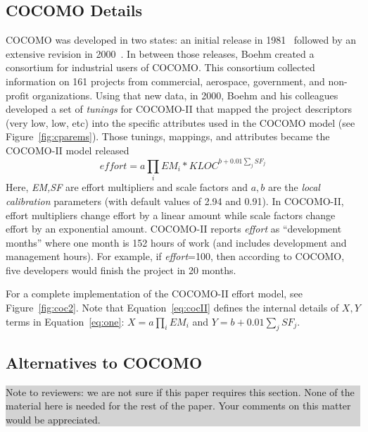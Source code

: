 \documentclass[final,twocolumn]{elsarticle}
\newcommand{\fig}[1]{Figure~\ref{fig:#1}}
\newcommand{\eq}[1]{Equation~\ref{eq:#1}}
\theoremstyle{break}
\begin{document}
 

  \subsection{COCOMO Details}

  COCOMO was developed in two states: an initial release in 1981~\cite{boehm81}
  followed by an extensive revision in  2000~\cite{boehm00b}.
  In between those releases,
  Boehm created a consortium for
industrial users of COCOMO.
This consortium
collected information on 161 projects from commercial,
aerospace, government, and non-profit organizations.
Using that new data, in 2000, Boehm and his colleagues developed
a set of   {\em tunings} for COCOMO-II that
mapped the project descriptors (very low, low, etc)
into the specific attributes used in the COCOMO model (see \fig{cparems}).
Those tunings, mappings, and attributes became the COCOMO-II model
released 
\begin{equation}\label{eq:cocII}
\mathit{effort}=a\prod_i EM_i *\mathit{KLOC}^{b+0.01\sum_j SF_j}
\end{equation}
Here, {\em EM,SF} are effort multipliers and scale factors and $a,b$ are the
{\em local calibration} parameters (with default values of 2.94 and 0.91).  In
COCOMO-II, effort multipliers change effort by a linear amount while scale
factors change effort by an exponential amount.  COCOMO-II reports {\em effort}
as ``development months'' where one month is 152 hours of work (and includes
development and management hours).  For example, if {\em effort}=100, then
according to COCOMO, five developers would finish the project in 20 months.

For a complete implementation of the COCOMO-II effort model, see \fig{coc2}.
Note that \eq{cocII} defines the internal details of $X,Y$ terms in \eq{one}:
\mbox{$X=a\prod_i EM_i$} and \mbox{$Y=b+0.01\sum_j SF_j$}.




\subsection{Alternatives to COCOMO} \label{sect:altCoc}

\noindent\colorbox{lightgray}{%
    \parbox{\dimexpr\linewidth-2\fboxsep}%
        {Note to reviewers: we are not sure if this paper requires this section. None of the material here is needed for the rest of the paper. Your comments on this matter would be appreciated.
        }
}
 
\end{document}
